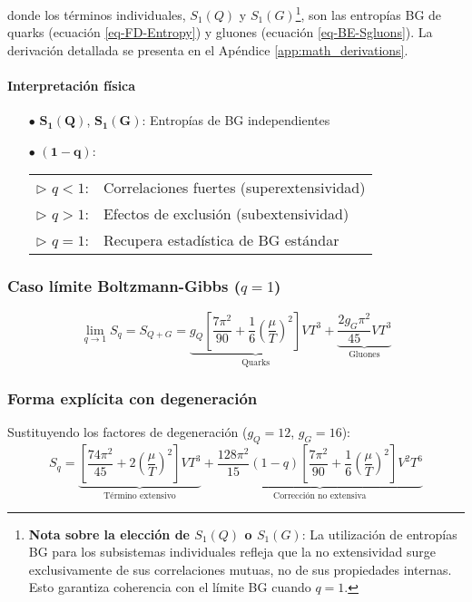 donde los términos individuales, ${S}_{1}(Q)$ y ${S}_{1}(G)$\footnote{\textbf{Nota sobre la elección de ${S}_{1}(Q)$ o ${S}_{1}(G)$}:
La utilización de entropías BG para los subsistemas individuales refleja que la no extensividad surge exclusivamente de sus correlaciones mutuas, no de sus propiedades internas. Esto garantiza coherencia con el límite BG cuando $q=1$.}, son las entropías BG de quarks (ecuación \ref{eq-FD-Entropy}) y gluones (ecuación \ref{eq-BE-Sgluons}). La derivación detallada se presenta en el Apéndice \ref{app:math_derivations}.

\paragraph{Interpretación física}  
\begin{itemize}
    \item[$\bullet$] $\bm{{S}_1\left(Q\right)}$, $\bm{{S}_1\left(G\right)}$: Entropías de BG independientes
    \item[$\bullet$] $\bm{\left(1-q\right)}$: \\ 
    \begin{tabular}{@{\quad}ll}
        $\triangleright$ $q<1$: & Correlaciones fuertes (superextensividad) \\
        $\triangleright$ $q>1$: & Efectos de exclusión (subextensividad) \\
        $\triangleright$ $q=1$: & Recupera estadística de BG estándar
    \end{tabular}
\end{itemize}

\subsubsection*{Caso límite Boltzmann-Gibbs ($q=1$)}
\begin{equation}\label{eq-BG-limit}
\lim_{q \to 1} {S}_q = {S}_{Q+G} = \underbrace{{g}_Q \left[\frac{7\pi^2}{90} + \frac{1}{6}\left(\frac{\mu}{T}\right)^2\right]V T^3}_{\text{Quarks}} + \underbrace{\frac{2g_G\pi^2}{45}V T^3}_{\text{Gluones}}
\end{equation}

\subsubsection*{Forma explícita con degeneración}
Sustituyendo los factores de degeneración ($g_Q=12$, $g_G=16$):
\begin{equation}\label{eq-Tsallis-Entropy-final}
{S}_q = \underbrace{\left[\frac{74\pi^2}{45} + 2\left(\frac{\mu}{T}\right)^2\right]V T^3}_{\text{Término extensivo}} + \underbrace{\frac{128\pi^2}{15}(1-q)\left[\frac{7\pi^2}{90} + \frac{1}{6}\left(\frac{\mu}{T}\right)^2\right]V^2 T^6}_{\text{Corrección no extensiva}}
\end{equation}

